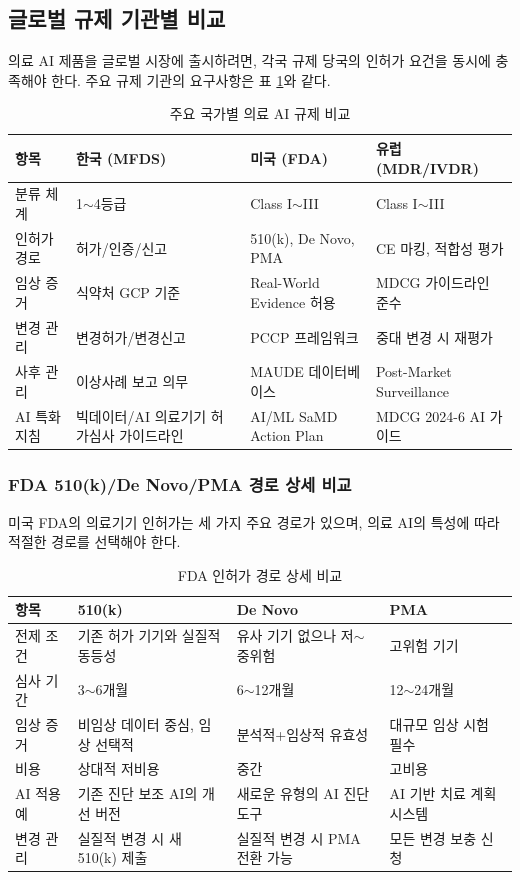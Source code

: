 \subsection{글로벌 규제 기관별 비교}
\label{sec:16.1.2}

의료 AI 제품을 글로벌 시장에 출시하려면, 각국 규제 당국의 인허가 요건을 동시에 충족해야 한다. 주요 규제 기관의 요구사항은 표 \ref{tab:16_reg_compare}와 같다.

\begin{table}[htbp]
\centering
\caption{주요 국가별 의료 AI 규제 비교}
\label{tab:16_reg_compare}
\begin{tabularx}{\textwidth}{p{2cm}p{3cm}p{3cm}X}
\toprule
\textbf{항목} & \textbf{한국 (MFDS)} & \textbf{미국 (FDA)} & \textbf{유럽 (MDR/IVDR)} \\
\midrule
분류 체계 & 1$\sim$4등급 & Class I$\sim$III & Class I$\sim$III \\
인허가 경로 & 허가/인증/신고 & 510(k), De Novo, PMA & CE 마킹, 적합성 평가 \\
임상 증거 & 식약처 GCP 기준 & Real-World Evidence 허용 & MDCG 가이드라인 준수 \\
변경 관리 & 변경허가/변경신고 & PCCP 프레임워크 & 중대 변경 시 재평가 \\
사후 관리 & 이상사례 보고 의무 & MAUDE 데이터베이스 & Post-Market Surveillance \\
AI 특화 지침 & 빅데이터/AI 의료기기 허가심사 가이드라인 & AI/ML SaMD Action Plan & MDCG 2024-6 AI 가이드 \\
\bottomrule
\end{tabularx}
\end{table}

\subsubsection{FDA 510(k)/De Novo/PMA 경로 상세 비교}

미국 FDA의 의료기기 인허가는 세 가지 주요 경로가 있으며, 의료 AI의 특성에 따라 적절한 경로를 선택해야 한다.

\begin{table}[htbp]
\centering
\caption{FDA 인허가 경로 상세 비교}
\label{tab:16_fda_pathways}
\begin{tabularx}{\textwidth}{p{2cm}p{3.5cm}p{3.5cm}X}
\toprule
\textbf{항목} & \textbf{510(k)} & \textbf{De Novo} & \textbf{PMA} \\
\midrule
전제 조건 & 기존 허가 기기와 실질적 동등성 & 유사 기기 없으나 저$\sim$중위험 & 고위험 기기 \\
심사 기간 & 3$\sim$6개월 & 6$\sim$12개월 & 12$\sim$24개월 \\
임상 증거 & 비임상 데이터 중심, 임상 선택적 & 분석적+임상적 유효성 & 대규모 임상 시험 필수 \\
비용 & 상대적 저비용 & 중간 & 고비용 \\
AI 적용 예 & 기존 진단 보조 AI의 개선 버전 & 새로운 유형의 AI 진단 도구 & AI 기반 치료 계획 시스템 \\
변경 관리 & 실질적 변경 시 새 510(k) 제출 & 실질적 변경 시 PMA 전환 가능 & 모든 변경 보충 신청 \\
\bottomrule
\end{tabularx}
\end{table}

